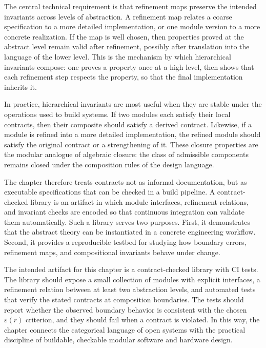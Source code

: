 The central technical requirement is that refinement maps preserve the intended invariants across levels of abstraction. A refinement map relates a coarse specification to a more detailed implementation, or one module version to a more concrete realization. If the map is well chosen, then properties proved at the abstract level remain valid after refinement, possibly after translation into the language of the lower level. This is the mechanism by which hierarchical invariants compose: one proves a property once at a high level, then shows that each refinement step respects the property, so that the final implementation inherits it.

In practice, hierarchical invariants are most useful when they are stable under the operations used to build systems. If two modules each satisfy their local contracts, then their composite should satisfy a derived contract. Likewise, if a module is refined into a more detailed implementation, the refined module should satisfy the original contract or a strengthening of it. These closure properties are the modular analogue of algebraic closure: the class of admissible components remains closed under the composition rules of the design language.

The chapter therefore treats contracts not as informal documentation, but as executable specifications that can be checked in a build pipeline. A contract-checked library is an artifact in which module interfaces, refinement relations, and invariant checks are encoded so that continuous integration can validate them automatically. Such a library serves two purposes. First, it demonstrates that the abstract theory can be instantiated in a concrete engineering workflow. Second, it provides a reproducible testbed for studying how boundary errors, refinement maps, and compositional invariants behave under change.

The intended artifact for this chapter is a contract-checked library with CI tests. The library should expose a small collection of modules with explicit interfaces, a refinement relation between at least two abstraction levels, and automated tests that verify the stated contracts at composition boundaries. The tests should report whether the observed boundary behavior is consistent with the chosen \(\varepsilon(r)\) criterion, and they should fail when a contract is violated. In this way, the chapter connects the categorical language of open systems with the practical discipline of buildable, checkable modular software and hardware design.

